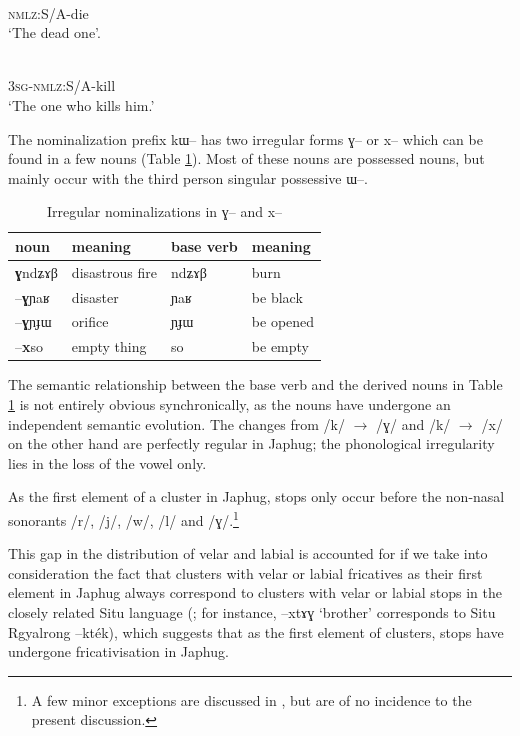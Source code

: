 \documentclass[oldfontcommands,oneside,a4paper,11pt]{article}
\newcommand{\ipa}[1]{{\phon \mbox{#1}}} %
\begin{document}
 \begin{exe}
\ex
\gll \ipa{kɯ-si}    \\
  \textsc{nmlz}:S/A-die \\
 \glt  `The dead one'.
 
\ex \label{ex:kill}
\gll \ipa{ɯ-kɯ-sat}    \\
  \textsc{3sg}-\textsc{nmlz}:S/A-kill \\
 \glt  `The one who kills him.'
 \end{exe}


The nominalization prefix \ipa{kɯ}-- has two irregular forms   \ipa{ɣ}-- or \ipa{x}-- which can be found in a few nouns  (Table \ref{tab:irr.nmlz}). Most of these nouns are possessed nouns, but mainly occur with the third person singular possessive \ipa{ɯ}--.

\begin{table}[H]
\caption{Irregular nominalizations in \ipa{ɣ}-- and \ipa{x}--} \label{tab:irr.nmlz} \centering
\begin{tabular}{llll}
\toprule
 noun & meaning &base verb & meaning\\
\midrule
\ipa{\textbf{ɣ}ndʑɤβ} & disastrous fire & \ipa{ndʑɤβ} & burn \\
\ipa{--\textbf{ɣ}ɲaʁ}   &disaster& \ipa{ɲaʁ} & be black \\
\ipa{--\textbf{ɣ}ɲɟɯ}   & orifice & \ipa{ɲɟɯ} & be opened \\
\ipa{--\textbf{x}so}   &  empty thing &\ipa{so} & be empty \\
\bottomrule
\end{tabular}
\end{table}

The semantic relationship between the base verb and the derived nouns in Table \ref{tab:irr.nmlz} is not entirely obvious synchronically, as the nouns have undergone an independent semantic evolution.  The changes from /k/ $\rightarrow$ /ɣ/ and /k/ $\rightarrow$ /x/ on the other hand are perfectly regular in Japhug; the phonological irregularity lies in the loss of the vowel only.

As the first element of a cluster in Japhug, stops only occur before the non-nasal sonorants /r/, /j/, /w/, /l/ and /ɣ/.\footnote{A few minor exceptions are discussed in \citet[45, 261]{jacques04these}, but are of no incidence to the present discussion.}

This gap in the distribution of velar and labial is accounted for if we take into consideration the fact that clusters with velar or labial fricatives as their first element in Japhug always correspond to clusters with velar or labial stops in the closely related Situ language  (\citealt[270]{jacques04these}; for instance,  \ipa{--xtɤɣ} `brother' corresponds to Situ Rgyalrong \ipa{--kték}), which suggests that as the first element of clusters, stops have undergone fricativisation in Japhug. 
\end{document}
